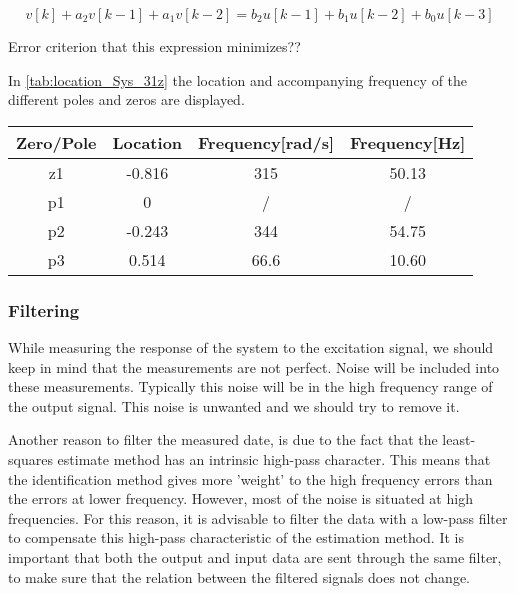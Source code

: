 \documentclass[a4paper]{article}
\newcommand{\newpar}{\vspace{.3cm}\noindent}
\begin{document}
\begin{equation}
    v[k] + a_2 v[k-1] + a_1 v[k-2] = b_2 u[k-1] + b_1 u[k-2] + b_0 u[k-3]
    \label{eq:difference equation}
\end{equation}

\newpar
Error criterion that this expression minimizes??

\newpar
In \autoref{tab:location_Sys_31z} the location and accompanying frequency of the different poles and zeros are displayed.

\begin{center}
    \begin{tabular}{ |c|c|c|c|}
    \hline
    Zero/Pole & Location & Frequency{[}rad/s{]} & Frequency{[}Hz{]}  \\
    \hline
    z1        & -0.816    & 315                 &  50.13           \\
    \hline
    p1        & 0         & /                   & /                \\
    \hline
    p2        & -0.243    & 344                 & 54.75            \\
    \hline
    p3        & 0.514     & 66.6                 & 10.60           \\ 
    \hline
    \end{tabular}  
    \label{tab:location_Sys_31z}
\end{center}

\subsubsection{Filtering}
While measuring the response of the system to the excitation signal, we should keep in mind that the measurements are not perfect. Noise will be included into these measurements. Typically this noise will be in the high frequency range of the output signal. This noise is unwanted and we should try to remove it. 

\newpar
Another reason to filter the measured date, is due to the fact that the least-squares estimate method has an intrinsic high-pass character. This means that the identification method gives more 'weight' to the high frequency errors than the errors at lower frequency. However, most of the noise is situated at high frequencies. For this reason, it is advisable to filter the data with a low-pass filter to compensate this high-pass characteristic of the estimation method. It is important that both the output and input data are sent through the same filter, to make sure that the relation between the filtered signals does not change. 
\end{document}
